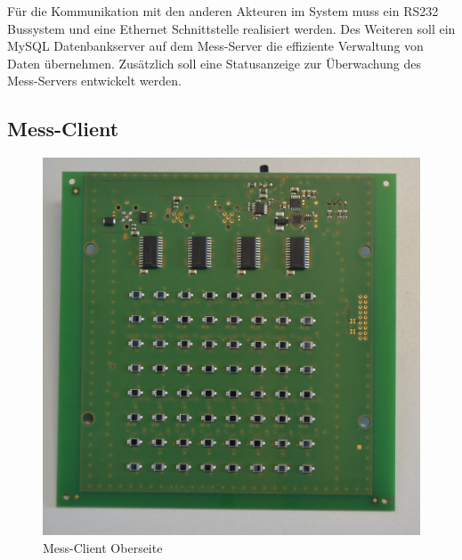 Für die Kommunikation mit den anderen Akteuren im System muss ein RS232 Bussystem und eine Ethernet Schnittstelle realisiert werden. Des Weiteren soll ein MySQL Datenbankserver auf dem Mess-Server die effiziente Verwaltung von Daten übernehmen. Zusätzlich soll eine Statusanzeige zur Überwachung des Mess-Servers entwickelt werden.


\subsection{Mess-Client}
\label{section_Mess-Client}
 
 \begin{figure}[H]
  \includegraphics[width=\linewidth]{img/general/DegraBoardTop.jpg}
  \caption{Mess-Client Oberseite}\label{figure_DegraBoardTop}
\endminipage\hfill
{}%

\end{figure}
